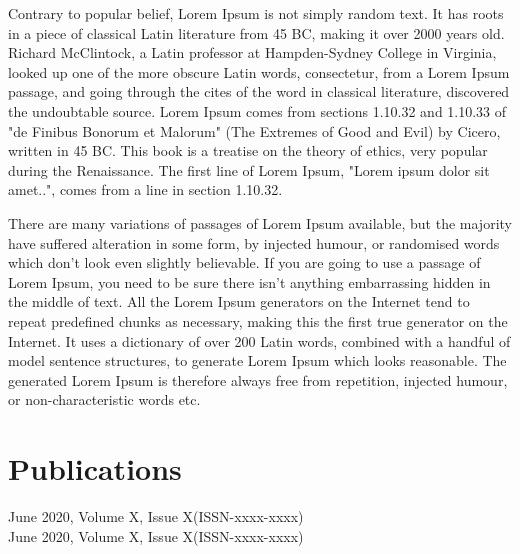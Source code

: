 \documentclass[]{charan}
\begin{document}
\vspace{0.3em}
\descript{}
Contrary to popular belief, Lorem Ipsum is not simply random text. It has roots in a piece of classical Latin literature from 45 BC, making it over 2000 years old. Richard McClintock, a Latin professor at Hampden-Sydney College in Virginia, looked up one of the more obscure Latin words, consectetur, from a Lorem Ipsum passage, and going through the cites of the word in classical literature, discovered the undoubtable source. Lorem Ipsum comes from sections 1.10.32 and 1.10.33 of "de Finibus Bonorum et Malorum" (The Extremes of Good and Evil) by Cicero, written in 45 BC. This book is a treatise on the theory of ethics, very popular during the Renaissance. The first line of Lorem Ipsum, "Lorem ipsum dolor sit amet..", comes from a line in section 1.10.32.
\sectionsep

\vspace{0.3em}
\descript{}
There are many variations of passages of Lorem Ipsum available, but the majority have suffered alteration in some form, by injected humour, or randomised words which don't look even slightly believable. If you are going to use a passage of Lorem Ipsum, you need to be sure there isn't anything embarrassing hidden in the middle of text. All the Lorem Ipsum generators on the Internet tend to repeat predefined chunks as necessary, making this the first true generator on the Internet. It uses a dictionary of over 200 Latin words, combined with a handful of model sentence structures, to generate Lorem Ipsum which looks reasonable. The generated Lorem Ipsum is therefore always free from repetition, injected humour, or non-characteristic words etc.
\sectionsep 


\section{Publications}
\vspace{0.3em}
\descript{}
June 2020, Volume X, Issue X(ISSN-xxxx-xxxx)
\sectionsep \\
\vspace{0.3em}
\descript{}
June 2020, Volume X, Issue X(ISSN-xxxx-xxxx)
\end{document}
